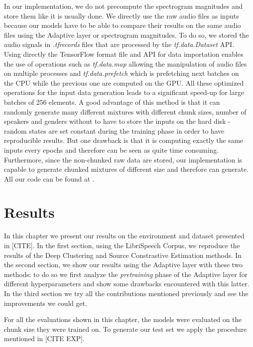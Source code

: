 \documentclass[master, tikz, final,11pt, dvipdfmx]{iscs-thesis}
\begin{document}
In our implementation, we do not precompute the spectrogram magnitudes and store them like it is usually done. We directly use the raw audio files as inputs because our models have to be able to compare their results on the same audio files using the Adaptive layer or spectrogram magnitudes. To do so, we stored the audio signals in \textit{.tfrecords} files that are processed by the \textit{tf.data.Dataset} API. Using directly the TensorFlow format file and API for data importation enables the use of operations such as \textit{tf.data.map} allowing the manipulation of audio files on multiple processes and \textit{tf.data.prefetch} which is prefetching next batches on the CPU while the previous one are computed on the GPU.
All these optimized operations for the input data generation leads to a significant speed-up for large batches of 256 elements. A good advantage of this method is that it can randomly generate many different mixtures with different chunk sizes, number of speakers and genders without to have to store the inputs on the hard disk - random states are set constant during the training phase in order to have reproducible results. But one drawback is that it is computing exactly the same inputs every epochs and therefore can be seen as quite time consuming.
 Furthermore, since the non-chunked raw data are stored, our implementation is capable to generate chunked mixtures of different size and therefore can generate. All our code can be found at \cite{github}.

\chapter{Results}
\label{res}

In this chapter we present our results on the environment and dataset presented in [CITE].
In the first section, using the LibriSpeech Corpus, we reproduce the results of the Deep Clustering and Source Constrastive Estimation methods. In the second section, we show our results using the Adaptive layer with these two methods: to do so we first analyze the \textit{pretraining} phase of the Adaptive layer for different hyperparameters and show some drawbacks encountered with this latter. In the third section we try all the contributions mentioned previously and see the improvements we could get.

For all the evaluations shown in this chapter, the models were evaluated on the chunk size they were trained on. To generate our test set we apply the procedure mentioned in [CITE EXP].
 
\end{document}
